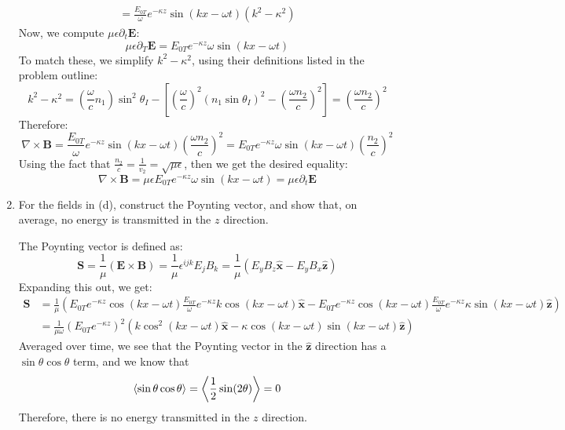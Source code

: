 \documentclass[10pt]{article}
\begin{document}
\begin{enumerate}[label=(\alph*)]
\begin{solution}
\begin{multline*}
					= \frac{E_{0T}}{\omega}
					e^{-\kappa z} \sin (kx - \omega t) (k^2 - \kappa^2)
				\end{multline*}
				Now, we compute \( \mu \epsilon \partial_t \mathbf{E} \):
				\[
					\mu \epsilon \partial_T \mathbf{E} = E_{0T}e^{-\kappa z}\omega \sin(kx - \omega t)
				\]
				To match these, we simplify \( k^2 - \kappa^2 \), using their definitions listed in the
				problem outline:
				\[
					k^2 - \kappa^2 = \left( \frac{\omega}{c}n_1 \right)\sin^2 \theta_I - \left[ \left(
					\frac{\omega}{c} \right)^2 (n_1 \sin \theta_I)^2 - \left( \frac{\omega n_2}{c} \right)^2
					\right]= \left( \frac{\omega n_2}{c} \right)^2
				\]
				Therefore:
				\[
					\nabla \times \mathbf{B} = \frac{E_{0T}}{\omega}e^{-\kappa z}\sin(kx - \omega t) \left(
					\frac{\omega n_2}{c} \right)^2 = E_{0T}e^{-\kappa z} \omega \sin (kx - \omega t) \left(
				\frac{n_2}{c} \right)^2
				\]
				Using the fact that \( \frac{n_2}{c} = \frac{1}{v_2} = \sqrt{\mu \epsilon} \), then we get
				the desired equality:
				\[
					\nabla \times \mathbf{B} = \mu \epsilon E_{0T}e^{-\kappa z} \omega \sin(kx - \omega t) =
					\mu \epsilon \partial_t \mathbf{E}
				\]
			\end{solution}
		\item For the fields in (d), construct the Poynting vector, and show that, on average, no energy is
			transmitted in the \( z \) direction. 

			\begin{solution}
				The Poynting vector is defined as:
				\[
					\mathbf{S} = \frac{1}{\mu}(\mathbf{E} \times \mathbf{B}) = \frac{1}{\mu}
					\epsilon^{ijk}E_j B_k = \frac{1}{\mu}(E_y B_z \mathbf{\hat{x}} - E_y B_x
					\mathbf{\hat{z}}) 
				\]
				Expanding this out, we get:
				\begin{align*}
					\mathbf{S} &= \frac{1}{\mu}\left( E_{0T} e^{-\kappa z} \cos(kx - \omega t)
					\frac{E_{0T}}{\omega} e^{-\kappa z} k \cos(kx -\omega t) \mathbf{\hat{x}} -
				E_{0T}e^{-\kappa z} \cos(kx - \omega t) \frac{E_{0T}}{\omega} e^{-\kappa z} \kappa \sin(kx -
			\omega t) \mathbf{\hat{z}}\right)\\
			&= \frac{1}{\mu \omega}\left( E_{0T}e^{-\kappa z} \right)^2 \left( k \cos^2(kx - \omega t)
			\mathbf{\hat{x}} - \kappa \cos(kx - \omega t) \sin(kx - \omega t) \mathbf{\hat{z}} \right)
				\end{align*}
				Averaged over time, we see that the Poynting vector in the \( \mathbf{\hat{z}} \) direction
				has a \( \sin \theta \cos \theta \) term, and we know that
				\[
					\left\langle \sin \theta \cos \theta \right\rangle = \left\langle \frac{1}{2} \sin(2 \theta) \right\rangle = 0
				\]
				Therefore, there is no energy transmitted in the \( z \) direction. 
			\end{solution}
	\end{enumerate}
\end{document}
